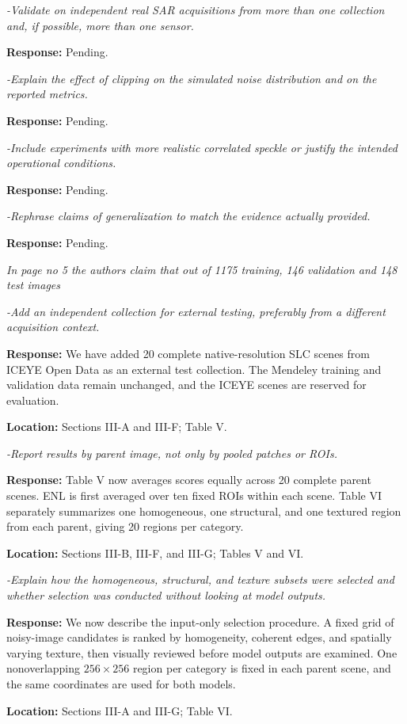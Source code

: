 \documentclass[11pt,letterpaper]{article}
\newcommand{\pendingbullet}[1]{%
  \Needspace{4\baselineskip}%
  \textit{#1}\par
  {\small\textbf{Response:} Pending.}\par
  \vspace{3pt}%
}
\newcommand{\reviewgroup}[1]{%
  \Needspace{5\baselineskip}%
  \medskip\textit{#1}\par
}
\begin{document}
\pendingbullet{-Validate on independent real SAR acquisitions from more than one collection and, if possible, more than one sensor.}

\pendingbullet{-Explain the effect of clipping on the simulated noise distribution and on the reported metrics.}

\pendingbullet{-Include experiments with more realistic correlated speckle or justify the intended operational conditions.}

\pendingbullet{-Rephrase claims of generalization to match the evidence actually provided.}

\reviewgroup{In page no 5 the authors claim that out of 1175 training, 146 validation and 148 test images}

\textit{-Add an independent collection for external testing, preferably from a different acquisition context.}

\textbf{Response:} We have added 20 complete native-resolution SLC scenes from ICEYE Open Data as an external test collection. The Mendeley training and validation data remain unchanged, and the ICEYE scenes are reserved for evaluation.

\textbf{Location:} Sections III-A and III-F; Table V.

\textit{-Report results by parent image, not only by pooled patches or ROIs.}

\textbf{Response:} Table V now averages scores equally across 20 complete parent scenes. ENL is first averaged over ten fixed ROIs within each scene. Table VI separately summarizes one homogeneous, one structural, and one textured region from each parent, giving 20 regions per category.

\textbf{Location:} Sections III-B, III-F, and III-G; Tables V and VI.

\textit{-Explain how the homogeneous, structural, and texture subsets were selected and whether selection was conducted without looking at model outputs.}

\textbf{Response:} We now describe the input-only selection procedure. A fixed grid of noisy-image candidates is ranked by homogeneity, coherent edges, and spatially varying texture, then visually reviewed before model outputs are examined. One nonoverlapping \(256\times256\) region per category is fixed in each parent scene, and the same coordinates are used for both models.

\textbf{Location:} Sections III-A and III-G; Table VI.
\end{document}

